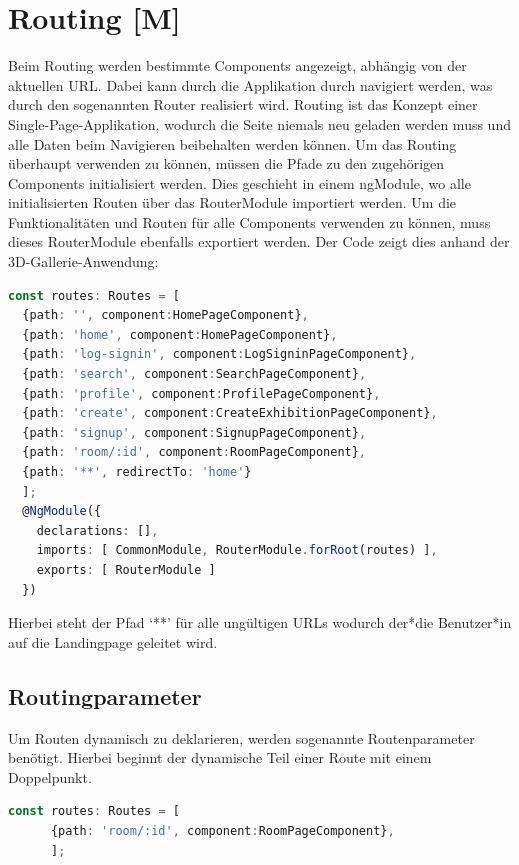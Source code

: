 \section{Routing [M]}\label{sec:Routing}
Beim Routing werden bestimmte Components angezeigt, abhängig von der aktuellen URL. Dabei kann durch die Applikation durch navigiert werden, was durch den sogenannten Router realisiert wird. Routing ist das Konzept einer Single-Page-Applikation, wodurch die Seite niemals neu geladen werden muss und alle Daten beim Navigieren beibehalten werden können. Um das Routing überhaupt verwenden zu können, müssen die Pfade zu den zugehörigen Components initialisiert werden. Dies geschieht in einem ngModule, wo alle initialisierten Routen über das RouterModule importiert werden. Um die Funktionalitäten und Routen für alle Components verwenden zu können, muss dieses RouterModule ebenfalls exportiert werden. Der Code zeigt dies anhand der 3D-Gallerie-Anwendung:
\begin{lstlisting}[caption={Routing in der 3D-Gallery},language=TypeScript,label=lst:impl:routing]
const routes: Routes = [
  {path: '', component:HomePageComponent},
  {path: 'home', component:HomePageComponent},
  {path: 'log-signin', component:LogSigninPageComponent},
  {path: 'search', component:SearchPageComponent},
  {path: 'profile', component:ProfilePageComponent},
  {path: 'create', component:CreateExhibitionPageComponent},
  {path: 'signup', component:SignupPageComponent},
  {path: 'room/:id', component:RoomPageComponent},
  {path: '**', redirectTo: 'home'}
  ];
  @NgModule({
    declarations: [],
    imports: [ CommonModule, RouterModule.forRoot(routes) ],
    exports: [ RouterModule ]
  })

\end{lstlisting}
Hierbei steht der Pfad ‘**’ für alle ungültigen URLs wodurch der*die Benutzer*in auf die Landingpage geleitet wird.

\subsection{Routingparameter}
Um Routen dynamisch zu deklarieren, werden sogenannte Routenparameter benötigt. Hierbei beginnt der dynamische Teil einer Route mit einem Doppelpunkt. 

\begin{lstlisting}[caption={Routingparamter in der 3D-Gallery},language=TypeScript,label=lst:impl:routingparameter]
    const routes: Routes = [
      {path: 'room/:id', component:RoomPageComponent},
      ];    
\end{lstlisting}

